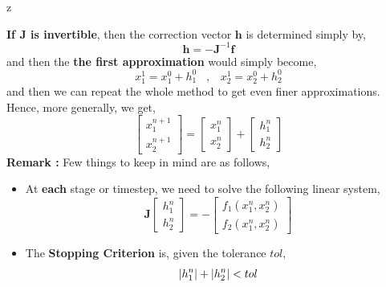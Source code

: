 z\documentclass[a4paper,12pt,twoside]{book}
\newcommand{\nll}[0]{\newline\newline}
\DeclarePairedDelimiter\abs{\lvert}{\rvert}
\begin{document}
\textbf{If $\mathbf{J}$ is invertible}, then the correction vector $\mathbf{h}$ is determined simply by,
\[ \boxed{\mathbf{h} = - \mathbf{J}^{-1} \mathbf{f} }\]
and then the \textbf{the first approximation} would simply become,
\[\boxed{x_1^1 = x_1^0 + h_1^0 \;\;\;, \;\;\; x_2^1 = x_2^0 + h_2^0}\]
and then we can repeat the whole method to get even finer approximations. Hence, more generally, we get,
\[ \begin{bmatrix} x_1^{n+1} \\ x_2^{n+1}\end{bmatrix} =  \begin{bmatrix} x_1^{n} \\ x_2^{n}\end{bmatrix} + \begin{bmatrix} h_1^{n} \\ h_2^{n}\end{bmatrix}\]
\nll
\textbf{Remark : } Few things to keep in mind are as follows,
\begin{itemize}
    \item {At \textbf{each} stage or timestep, we need to solve the following linear system,
    \[ \mathbf{J}  \begin{bmatrix} h_1^n \\ h_2^n \end{bmatrix} = - \begin{bmatrix} f_1(x_1^n, x_2^n)\\f_2(x_1^n, x_2^n)
        \end{bmatrix} \]
    }
    \item{The \textbf{Stopping Criterion} is, given the tolerance $tol$,
    \[ \abs{h_1^n} + \abs{h_2^n} < tol \]
    }
\end{itemize}
\end{document}
